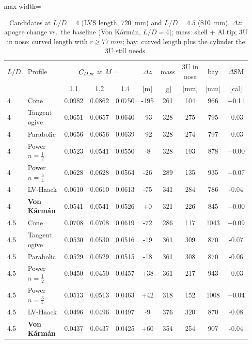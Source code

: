 \begin{table}[H]
\centering
\caption{Candidates at $L/D=4$ (LVS length, \SI{720}{mm}) and $L/D=4.5$ (\SI{810}{mm}). $\Delta z$: apogee change vs.\ the baseline (Von K\'arm\'an, $L/D=4$); mass: shell + Al tip; 3U in nose: curved length with $r\geq\SI{77}{mm}$; bay: curved length plus the cylinder the 3U still needs.}
\label{tab:trade}
\small
\begin{adjustbox}{max width=\textwidth}
\begin{tabular}{@{}llcccccccc@{}}
\toprule
$L/D$ & Profile & \multicolumn{3}{c}{$C_{D,\rm w}$ at $M=$} & $\Delta z$ & mass & 3U in nose & bay & $\Delta$SM \\
 & & 1.1 & 1.2 & 1.4 & [m] & [g] & [mm] & [mm] & [cal] \\
\midrule
4 & Cone & 0.0982 & 0.0862 & 0.0750 & -195 & 261 & 104 & 966 & +0.11 \\
4 & Tangent ogive & 0.0651 & 0.0657 & 0.0640 & -93 & 328 & 275 & 795 & -0.03 \\
4 & Parabolic & 0.0656 & 0.0656 & 0.0639 & -92 & 328 & 274 & 797 & -0.03 \\
4 & Power $n=\tfrac12$ & 0.0523 & 0.0541 & 0.0550 & -8 & 328 & 193 & 878 & +0.00 \\
4 & Power $n=\tfrac34$ & 0.0628 & 0.0628 & 0.0564 & -26 & 289 & 135 & 935 & +0.07 \\
4 & LV-Haack & 0.0610 & 0.0610 & 0.0613 & -75 & 341 & 284 & 786 & -0.04 \\
4 & \textbf{Von K\'arm\'an} & 0.0541 & 0.0541 & 0.0526 & +0 & 321 & 226 & 845 & +0.00 \\
\midrule
4.5 & Cone & 0.0708 & 0.0708 & 0.0619 & -72 & 286 & 117 & 1043 & +0.09 \\
4.5 & Tangent ogive & 0.0530 & 0.0530 & 0.0516 & -19 & 361 & 309 & 870 & -0.07 \\
4.5 & Parabolic & 0.0529 & 0.0529 & 0.0515 & -18 & 361 & 308 & 870 & -0.06 \\
4.5 & Power $n=\tfrac12$ & 0.0450 & 0.0450 & 0.0457 & +38 & 361 & 217 & 943 & -0.03 \\
4.5 & Power $n=\tfrac34$ & 0.0513 & 0.0513 & 0.0463 & +42 & 318 & 152 & 1008 & +0.04 \\
4.5 & LV-Haack & 0.0496 & 0.0496 & 0.0497 & -9 & 376 & 320 & 870 & -0.08 \\
4.5 & \textbf{Von K\'arm\'an} & 0.0437 & 0.0437 & 0.0425 & +60 & 354 & 254 & 907 & -0.04 \\
\bottomrule
\end{tabular}
\end{adjustbox}
\end{table}
